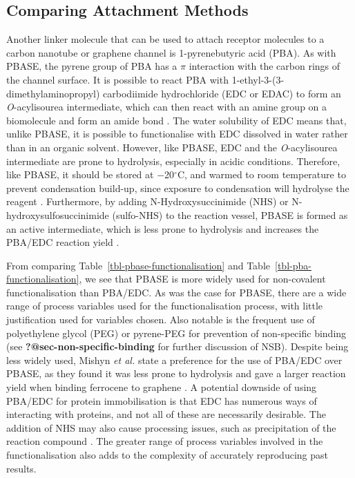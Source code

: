 \documentclass[
  a4paper,
]{scrbook}
\begin{document}
\hypertarget{comparing-attachment-methods-1}{%
\subsection{Comparing Attachment
Methods}\label{comparing-attachment-methods-1}}

Another linker molecule that can be used to attach receptor molecules to
a carbon nanotube or graphene channel is 1-pyrenebutyric acid (PBA). As
with PBASE, the pyrene group of PBA has a \(\pi\) interaction with the
carbon rings of the channel surface. It is possible to react PBA with
1-ethyl-3-(3-dimethylaminopropyl) carbodiimide hydrochloride (EDC or
EDAC) to form an \emph{O}-acylisourea intermediate, which can then react
with an amine group on a biomolecule and form an amide bond
\autocite{Sehgal1994,Hermanson2013-4}. The water solubility of EDC means
that, unlike PBASE, it is possible to functionalise with EDC dissolved
in water rather than in an organic solvent. However, like PBASE, EDC and
the \emph{O}-acylisourea intermediate are prone to hydrolysis,
especially in acidic conditions. Therefore, like PBASE, it should be
stored at −20\(^\circ\)C, and warmed to room temperature to prevent
condensation build-up, since exposure to condensation will hydrolyse the
reagent \autocite{Hermanson2013-4}. Furthermore, by adding
N-Hydroxysuccinimide (NHS) or N-hydroxysulfosuccinimide (sulfo-NHS) to
the reaction vessel, PBASE is formed as an active intermediate, which is
less prone to hydrolysis and increases the PBA/EDC reaction yield
\autocite{Sehgal1994,Hermanson2013-4,Hermanson2013-14}.

From comparing Table~\ref{tbl-pbase-functionalisation} and
Table~\ref{tbl-pba-functionalisation}, we see that PBASE is more widely
used for non-covalent functionalisation than PBA/EDC. As was the case
for PBASE, there are a wide range of process variables used for the
functionalisation process, with little justification used for variables
chosen. Also notable is the frequent use of polyethylene glycol (PEG) or
pyrene-PEG for prevention of non-specific binding (see
\textbf{?@sec-non-specific-binding} for further discussion of NSB).
Despite being less widely used, Mishyn \emph{et al.} state a preference
for the use of PBA/EDC over PBASE, as they found it was less prone to
hydrolysis and gave a larger reaction yield when binding ferrocene to
graphene \autocite{Mishyn2022}. A potential downside of using PBA/EDC
for protein immobilisation is that EDC has numerous ways of interacting
with proteins, and not all of these are necessarily desirable. The
addition of NHS may also cause processing issues, such as precipitation
of the reaction compound \autocite{Hermanson2013-4}. The greater range
of process variables involved in the functionalisation also adds to the
complexity of accurately reproducing past results.
\end{document}
